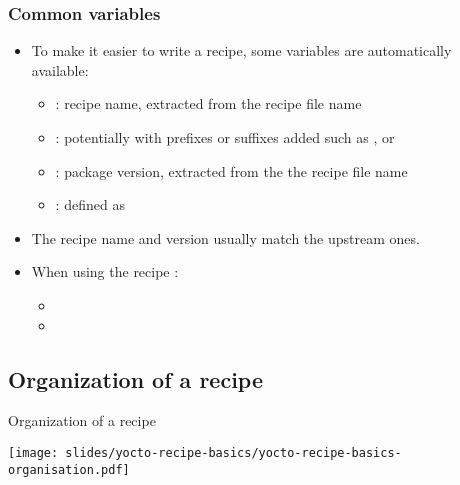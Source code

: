 \begin{frame}
  \frametitle{Common variables}
  \begin{itemize}
    \item To make it easier to write a recipe, some variables are
      automatically available:
      \begin{itemize}
        \item {}: recipe name, extracted from the recipe file name
        \item {}:  potentially with prefixes or suffixes added
          such as , or 
        \item {}: package version, extracted from the the recipe file name
        \item {}: defined as 
      \end{itemize}
    \item The recipe name and version usually match the upstream ones.
    \item When using the recipe :
      \begin{itemize}
        \item {}
        \item {}
      \end{itemize}
  \end{itemize}
\end{frame}

\subsection{Organization of a recipe}

\begin{frame}{Organization of a recipe}
  \begin{center}
    \texttt{[image: slides/yocto-recipe-basics/yocto-recipe-basics-organisation.pdf]}
  \end{center}
\end{frame}

